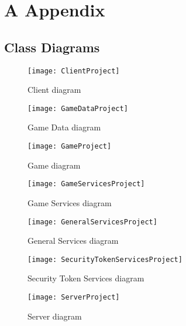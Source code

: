 \section{A Appendix}
\subsection{Class Diagrams}
\label{appendix:class_diagrams}
\begin{figure}[h]
\centerline{\texttt{[image: ClientProject]} }
\caption{Client diagram}
\end{figure}
\newpage
\begin{figure}[h]
\centerline{\texttt{[image: GameDataProject]} }
\caption{Game Data diagram}
\end{figure}
\newpage
\begin{figure}[h]
\centerline{\texttt{[image: GameProject]} }
\caption{Game diagram}
\end{figure}
\newpage
\begin{figure}[h]
\centerline{\texttt{[image: GameServicesProject]} }
\caption{Game Services diagram}
\end{figure}
\newpage
\begin{figure}[h]
\centerline{\texttt{[image: GeneralServicesProject]} }
\caption{General Services diagram}
\end{figure}
\newpage
\begin{figure}[h]
\centerline{\texttt{[image: SecurityTokenServicesProject]} }
\caption{Security Token Services diagram}
\end{figure}
\newpage
\begin{figure}[h]
\centerline{\texttt{[image: ServerProject]} }
\caption{Server diagram}
\end{figure}

